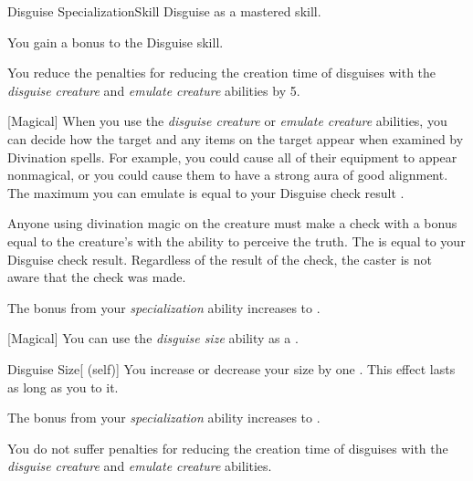    \begin{feat}{Disguise Specialization}{Skill}
        \featpre Disguise as a mastered skill.

         You gain a  bonus to the Disguise skill.

         You reduce the penalties for reducing the creation time of disguises with the \textit{disguise creature} and \textit{emulate creature} abilities by 5.

        [Magical] When you use the \textit{disguise creature} or \textit{emulate creature} abilities, you can decide how the target and any items on the target appear when examined by Divination spells.
        For example, you could cause all of their equipment to appear nonmagical, or you could cause them to have a strong aura of good alignment.
        The maximum  you can emulate is equal to your Disguise check result .

        Anyone using divination magic on the creature must make a check with a bonus equal to the creature's  with the ability to perceive the truth.
        The  is equal to your Disguise check result.
        Regardless of the result of the check, the caster is not aware that the check was made.

         The bonus from your \textit{specialization} ability increases to .

        [Magical] You can use the \textit{disguise size} ability as a .
        \begin{attuneability}{Disguise Size}[ (self)]
            You increase or decrease your size by one .
            This effect lasts as long as you  to it.
        \end{attuneability}

         The bonus from your \textit{specialization} ability increases to .

         You do not suffer penalties for reducing the creation time of disguises with the \textit{disguise creature} and \textit{emulate creature} abilities.
    \end{feat}

